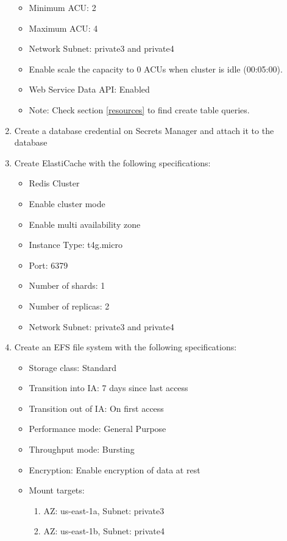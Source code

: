 \documentclass{article}
\begin{document}
\begin{enumerate}
\begin{itemize}
    \item Minimum ACU: 2
    \item Maximum ACU: 4
    \item Network Subnet: private3 and private4
    \item Enable scale the capacity to 0 ACUs when cluster is idle (00:05:00).
    \item Web Service Data API: Enabled
    \item Note: Check section \ref{resources} to find create table queries.
  \end{itemize}
  \item Create a database credential on Secrets Manager and attach it to the database
  \item Create ElastiCache with the following specifications:
  \begin{itemize}
    \item Redis Cluster
    \item Enable cluster mode
    \item Enable multi availability zone
    \item Instance Type: t4g.micro
    \item Port: 6379
    \item Number of shards: 1
    \item Number of replicas: 2
    \item Network Subnet: private3 and private4
  \end{itemize}
  \item Create an EFS file system with the following specifications:
  \begin{itemize}
    \item Storage class: Standard
    \item Transition into IA: 7 days since last access
    \item Transition out of IA: On first access
    \item Performance mode: General Purpose
    \item Throughput mode: Bursting
    \item Encryption: Enable encryption of data at rest
    \item Mount targets:
    \begin{enumerate}
        \item AZ: us-east-1a, Subnet: private3
        \item AZ: us-east-1b, Subnet: private4
    \end{enumerate}
  \end{itemize}

\end{enumerate}
\end{document}
